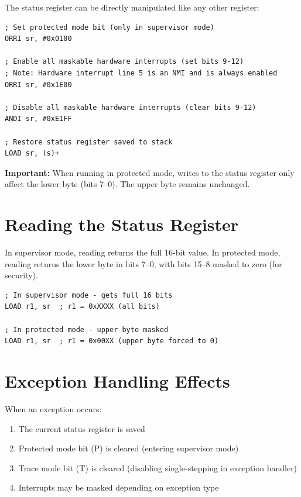 The status register can be directly manipulated like any other register:

\begin{lstlisting}
; Set protected mode bit (only in supervisor mode)
ORRI sr, #0x0100

; Enable all maskable hardware interrupts (set bits 9-12)
; Note: Hardware interrupt line 5 is an NMI and is always enabled
ORRI sr, #0x1E00

; Disable all maskable hardware interrupts (clear bits 9-12)
ANDI sr, #0xE1FF

; Restore status register saved to stack
LOAD sr, (s)+

\end{lstlisting}

\textbf{Important:} When running in protected mode, writes to the status register only affect the lower byte (bits 7--0). The upper byte remains unchanged.

\section{Reading the Status Register}

In supervisor mode, reading  returns the full 16-bit value. In protected mode, reading  returns the
lower byte in bits 7--0, with bits 15--8 masked to zero (for security).

\begin{lstlisting}
; In supervisor mode - gets full 16 bits
LOAD r1, sr  ; r1 = 0xXXXX (all bits)

; In protected mode - upper byte masked
LOAD r1, sr  ; r1 = 0x00XX (upper byte forced to 0)
\end{lstlisting}

\section{Exception Handling Effects}

When an exception occurs:

\begin{enumerate}
	\item The current status register is saved
	\item Protected mode bit (P) is cleared (entering supervisor mode)
	\item Trace mode bit (T) is cleared (disabling single-stepping in exception handler)
	\item Interrupts may be masked depending on exception type
\end{enumerate}


